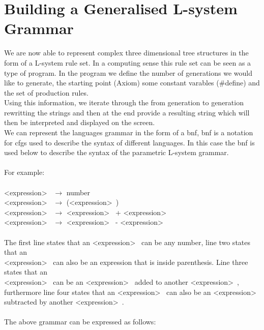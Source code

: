\section{Building a Generalised L-system Grammar}

We are now able to represent complex three dimensional tree structures in the form of a L-system rule set. In a computing sense this rule set can be seen as a type of program. In the program we define the number of generations we would like to generate, the starting point (Axiom) some constant varables (\#define) and the set of production rules. \\
Using this information, we iterate through the from generation to generation rewritting the strings and then at the end provide a resulting string which will then be interpreted and displayed on the screen.
\\
We can represent the languages grammar in the form of a \acrlong{bnf}, \acrshort{bnf} is a notation for \acrlong{cfg}s used to describe the syntax of different languages. In this case the \acrshort{bnf} is used below to describe the syntax of the parametric L-system grammar. \\
\\
For example: \\ 
\\
\textless expression\textgreater~ $\rightarrow$ number \\ 
\textless expression\textgreater~ $\rightarrow$ (\textless expression\textgreater~) \\
\textless expression\textgreater~ $\rightarrow$ \textless expression\textgreater~ + \textless expression\textgreater~ \\
\textless expression\textgreater~ $\rightarrow$ \textless expression\textgreater~ - \textless expression\textgreater~ \\
\\
The first line states that an \textless expression\textgreater~ can be any number, line two states that an \\ \textless expression\textgreater~ can also be an expression that is inside parenthesis. Line three states that an \\ \textless expression\textgreater~ can be an \textless expression\textgreater~ added to another \textless expression\textgreater~, furthermore line four states that an \textless expression\textgreater~ can also be an \textless expression\textgreater~ subtracted by another \textless expression\textgreater~. \\
\\
The above grammar can be expressed as follows: \\

